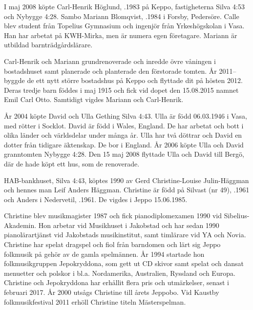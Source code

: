 I maj 2008 köpte Carl-Henrik Höglund, .1983 på Keppo, fastigheterna Silva 4:53 och Nybygge 4:28. Sambo Mariann Blomqvist, .1984 i Forsby, Pedersöre. Calle blev student från Topelius Gymnasium och ingenjör från Yrkeshögskolan i Vasa. Han har arbetat på KWH-Mirka, men är numera egen företagare. Mariann är utbildad barnträdgårdslärare.
\begin{jhchildren}
  \item {}
  \item {}
  \item {}
\end{jhchildren}
Carl-Henrik och Mariann grundrenoverade och inredde övre våningen i bostadshuset samt planerade och planterade den förstorade tomten. År 2011-- byggde de ett nytt större bostadshus på Keppo och flyttade dit på hösten 2012. Deras tredje barn föddes i maj 1915 och fick vid dopet den 15.08.2015 namnet Emil Carl Otto. Samtidigt vigdes Mariann och Carl-Henrik.


År 2004 köpte David och Ulla Gething Silva 4:43. Ulla är född 06.03.1946 i Vasa, med rötter i Socklot. David är född i Wales, England. De har arbetat och bott i olika länder och världsdelar under många år. Ulla har två döttrar och David en dotter från tidigare äktenskap. De bor i England. År 2006 köpte Ulla och David granntomten Nybygge 4:28. Den 15 maj 2008 flyttade Ulla och David till Bergö, där de hade köpt ett hus, som de renoverade.


HAB-bankhuset, Silva 4:43, köptes 1990 av Gerd Christine-Louise Julin-Häggman och hennes man Leif Anders Häggman. Christine är född på Silvast (nr 49), .1961 och Anders i Nedervetil, .1961. De vigdes i Jeppo 15.06.1985.

Christine blev musikmagister 1987 och fick pianodiplomexamen 1990 vid Sibelius-Akademin. Hon arbetar vid Musikhuset i Jakobstad och har sedan 1990 pianolärartjänst vid Jakobstads musikinstitut, samt timlärare vid YA och Novia. Christine har spelat dragspel och fiol från barndomen och lärt sig Jeppo folkmusik på gehör av de gamla spelmännen. År 1994 startade hon folkmusikgruppen Jepokryddona, som gett ut CD skivor samt spelat och dansat menuetter och polskor i bl.a. Nordamerika, Australien, Ryssland och Europa. Christine och Jepokryddona har erhållit flera pris och utmärkelser, senast i februari 2017. År 2000 utsågs Christine till årets Jeppobo. Vid Kaustby folkmusikfestival 2011 erhöll Christine titeln Mästerspelman.

